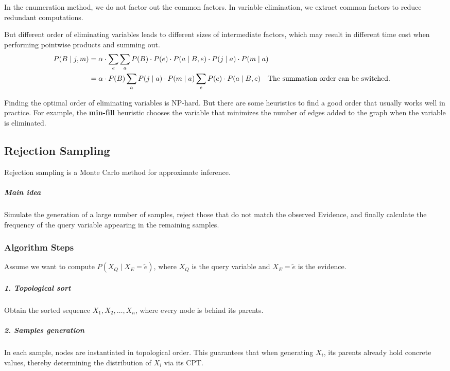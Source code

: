 \documentclass[10pt,UTF8]{article}
\theoremstyle{definition}
\newtheorem{definition inner}{Definition}[section]
\theoremstyle{definition}
\newtheorem{theorem inner}{Theorem}[section]
\theoremstyle{definition}
\newtheorem*{proof inner}{\textit{Proof}}
\theoremstyle{plain}
\newtheorem{tip inner}{Tip}[section]
\theoremstyle{remark}
\begin{document}
In the enumeration method,
we do not factor out the common factors.
In variable elimination,
we extract common factors to reduce redundant computations.

But different order of eliminating variables leads to different sizes
of intermediate factors,
which may result in different time cost when performing
pointwise products and summing out.
\begin{align*}
  P(B \mid j, m)
  & = \alpha \cdot \sum_{e} \sum_{a}
  P(B) \cdot P(e) \cdot P(a \mid B, e) \cdot
  P(j \mid a) \cdot P(m \mid a) \\
  & = \alpha \cdot P(B) \sum_{a}
  P(j \mid a) \cdot P(m \mid a) \sum_{e}
  P(e) \cdot P(a \mid B, e)
  \qq{\text{The summation order can be switched.}}
\end{align*}

Finding the optimal order of eliminating variables is NP-hard.
But there are some heuristics to find a good order
that usually works well in practice.
For example,
the \textbf{min-fill} heuristic chooses the variable
that minimizes the number of edges added to the graph
when the variable is eliminated.

\subsection{Rejection Sampling}

Rejection sampling is a Monte Carlo method for approximate inference.

\subparagraph*{Main idea}
Simulate the generation of a large number of samples,
reject those that do not match the observed Evidence,
and finally calculate the frequency of the query variable appearing
in the remaining samples.

\subsubsection{Algorithm Steps}

Assume we want to compute \( P(X_Q \mid X_E=\tilde{e}) \),
where \(X_Q\) is the query variable
and \(X_E=\tilde{e}\) is the evidence.

\subparagraph*{1. Topological sort}
Obtain the sorted sequence \(X_1, X_2, \ldots, X_n\),
where every node is behind its parents.

\subparagraph*{2. Samples generation}
In each sample, nodes are instantiated in topological order.
This guarantees that when generating \(X_i\),
its parents already hold concrete values,
thereby determining the distribution of \(X_i\) via its CPT\@.
\end{document}
